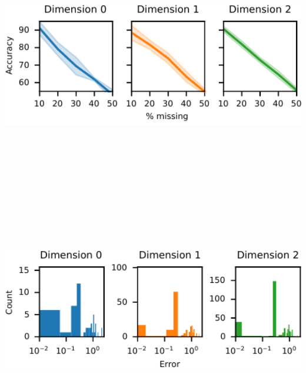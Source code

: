 \documentclass[landscape,a0paper]{tikzposter}
\begin{document}
\begin{columns}
{{\begin{center}
\begin{minipage}{0.49\linewidth}
\begin{center}
  \includegraphics[height=12cm]{figures/foo.pdf}
 \end{center}
 \end{minipage}
\begin{minipage}{0.49\linewidth}
\begin{center}
 \includegraphics[height=9cm]{figures/foo-2.pdf}
\end{center}
\end{minipage}

\end{center}


}}
\end{columns}
\end{document}
